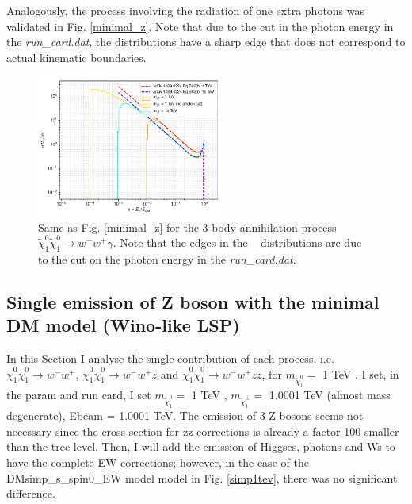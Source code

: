 \documentclass[epj,nopacs,fleqn]{svjour}
\begin{document}
Analogously, the process involving the radiation of one extra photons was validated in Fig. \ref{minimal_z}. Note that due to the cut in the photon energy in the  \textit{run\_card.dat}, the distributions have a sharp edge that does not correspond to actual kinematic boundaries. 

\begin{figure}[!h]
	\centering

 \includegraphics[width=0.55\textwidth]{Fig/Validation_1009/n1n1_wwa.pdf} 

	\caption{Same as Fig. \ref{minimal_z} for the 3-body annihilation process  $\tilde \chi _1 ^0  \tilde \chi _1 ^0 \rightarrow w^- w^+ \gamma$. Note that the edges in the \maddm~ distributions are due to the cut on the photon energy in the \textit{run\_card.dat}.}
	\label{minimal_a}
\end{figure}


\clearpage
\subsection{Single emission of Z boson with the minimal DM model (Wino-like LSP)}
In this Section I analyse the single contribution of each process, i.e. $\tilde \chi _1 ^0  \tilde \chi _1 ^0 \rightarrow w^- w^+$,  $\tilde \chi _1 ^0  \tilde \chi _1 ^0 \rightarrow w^- w^+z$ and  $\tilde \chi _1 ^0  \tilde \chi _1 ^0 \rightarrow w^- w^+ zz$, for $m_{\tilde \chi_1 ^0}=$ 1 TeV .  
I set, in the param and run card, I set $m_{\tilde \chi_1 ^0}=$ 1 TeV , $m_{\tilde \chi_1 ^{\pm}}=$ 1.0001 TeV (almost mass degenerate), Ebeam = 1.0001 TeV. 
The emission of 3 Z bosons seems not necessary since the cross section for zz corrections is already a factor 100 smaller than the tree level. Then, I will add the emission of Higgses, photons and Ws to have the complete EW corrections; however, in the case of the DMsimp\_s\_spin0\_EW model model in Fig. \ref{simp1tev}, there was no significant difference. 
\end{document}
